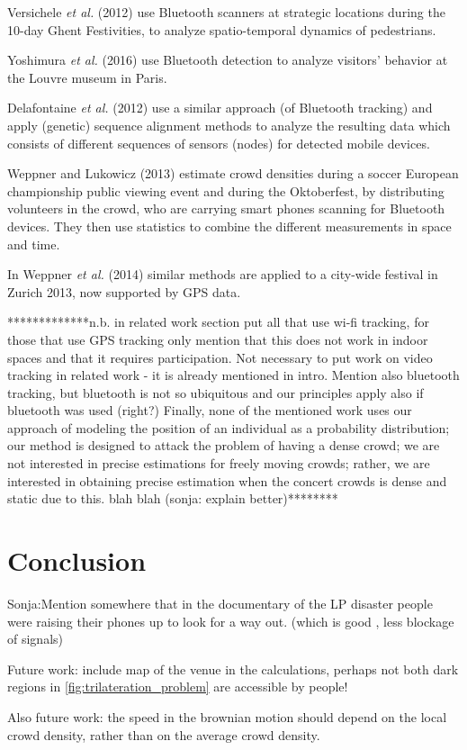 \documentclass[10pt,a4paper]{article}
\begin{document}
Versichele \textit{et al.} (2012) \cite{versichele:1} use Bluetooth scanners at strategic locations during the 10-day Ghent Festivities, to analyze spatio-temporal dynamics of pedestrians. 

Yoshimura \textit{et al.} (2016) \cite{yoshimura:1} use Bluetooth detection to analyze visitors' behavior at the Louvre museum in Paris.

Delafontaine \textit{et al.} (2012) \cite{delafontaine:1} use a similar approach (of Bluetooth tracking) and apply (genetic) sequence alignment methods to analyze the resulting data which consists of different sequences of sensors (nodes) for detected mobile devices.

Weppner and Lukowicz (2013) \cite{weppner:1} estimate crowd densities during a soccer European championship public viewing event and during the Oktoberfest, by distributing volunteers in the crowd, who are carrying smart phones scanning for Bluetooth devices. They then use statistics to combine the different measurements in space and time.

In Weppner \textit{et al.} (2014) \cite{weppner:2} similar methods are applied to a city-wide festival in Zurich 2013, now supported by GPS data.

*************n.b. in related work section put all that use wi-fi tracking, for those that use GPS tracking only mention that this does not work in indoor spaces and that it requires participation. Not necessary to put work on video tracking in related work - it is already mentioned in intro. Mention also bluetooth tracking, but bluetooth is not so ubiquitous and our principles apply also if bluetooth was used (right?) Finally, none of the mentioned work uses our approach of modeling the position of an individual as a probability distribution; our method is designed to attack the problem of having a dense crowd; we are not interested in precise estimations for freely moving crowds; rather, we are interested in obtaining precise estimation when the  concert crowds is dense and static due to this. blah blah (sonja: explain better)********


\section{Conclusion}\label{sec:conclusion}

Sonja:Mention somewhere that in the documentary of the LP disaster people were raising their phones up to look for a way out. (which is good , less blockage of signals)




Future work: include map of the venue in the calculations, perhaps not both dark  regions in \ref{fig:trilateration_problem} are accessible by people!

Also future work: the speed in the brownian motion should depend on the local crowd density, rather than on the average crowd density.



\end{document}
